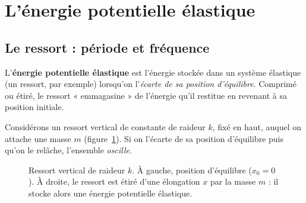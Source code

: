 \documentclass[11pt,a4paper]{article}
\begin{document}
\section{L'énergie potentielle élastique}
\subsection{Le ressort : période et fréquence}

\begin{definition}
L'\textbf{énergie potentielle élastique} est l'énergie stockée dans un système élastique (un
ressort, par exemple) lorsqu'on l'\emph{écarte de sa position d'équilibre}. Comprimé ou étiré, le
ressort « emmagasine » de l'énergie qu'il restitue en revenant à sa position initiale.
\end{definition}

Considérons un ressort vertical de constante de raideur $k$, fixé en haut, auquel on attache une
masse $m$ (figure~\ref{fig:ressort}). Si on l'écarte de sa position d'équilibre puis qu'on le
relâche, l'ensemble \emph{oscille}.

\begin{figure}[h]
\centering
{}
\caption{Ressort vertical de raideur $k$. À gauche, position d'équilibre ($x_0=0$). À droite, le
ressort est étiré d'une élongation $x$ par la masse $m$ : il stocke alors une énergie potentielle
élastique.}
\label{fig:ressort}
\end{figure}
\end{document}
